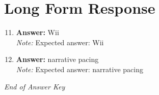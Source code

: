 \documentclass[12pt]{article}
\begin{document}
\section*{Long Form Response}
\begin{enumerate}[label=\arabic*.]
\setcounter{enumi}{10}
\item \textbf{Answer:} Wii
\\ \textit{Note:} Expected answer: Wii
\item \textbf{Answer:} narrative pacing
\\ \textit{Note:} Expected answer: narrative pacing
\end{enumerate}

\vfill
\noindent\textit{End of Answer Key}
\end{document}
